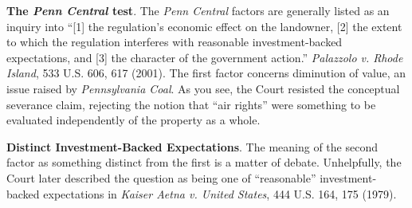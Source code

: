 
\item \textbf{The \textit{Penn Central} test}. The
\textit{Penn Central} factors are generally listed as an inquiry into ``[1] the
regulation's economic effect on the landowner, [2] the extent to which the
regulation interferes with reasonable investment-backed expectations, and [3]
the character of the government action.'' \emph{Palazzolo v. Rhode Island}, 533
U.S. 606, 617 (2001). The first factor concerns diminution of value, an issue
raised by \textit{Pennsylvania Coal}. As you see, the Court resisted the
conceptual severance claim, rejecting the notion that ``air rights'' were
something to be evaluated independently of the property as a whole.

\item \textbf{Distinct Investment-Backed Expectations}. The meaning of the
second factor as something distinct from the first is a matter of debate.
Unhelpfully, the Court later described the question as being one of
``reasonable'' investment-backed expectations in \textit{Kaiser Aetna v. United
States}, 444 U.S. 164, 175 (1979). 


